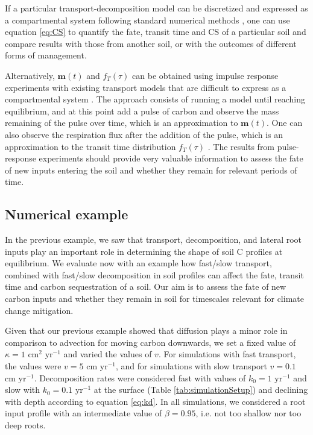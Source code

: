 \documentclass[11pt, oneside, a4paper]{article}   	%
\begin{document}
If a particular transport-decomposition model can be discretized and expressed as a compartmental system following standard numerical methods \citep{LeVeque2007, Lanczos}, one can use equation \ref{eq:CS} to quantify the fate, transit time and CS of a particular soil and compare results with those from another soil, or with the outcomes of different forms of management. 

Alternatively, $\bm{m}(t)$ and $f_T(\tau)$ can be obtained using impulse response experiments with existing transport models that are difficult to express as a compartmental system \citep{Thompson1999, Metzler2018MG}. The approach consists of running a model until reaching equilibrium, and at this point add a pulse of carbon and observe the mass remaining of the pulse over time, which is an approximation to $\bm{m}(t) $. One can also observe the respiration flux after the addition of the pulse, which is an approximation to the transit time distribution $f_T(\tau)$ \citep{Metzler2018MG}. The results from pulse-response experiments should provide very valuable information to assess the fate of new inputs entering the soil and whether they remain for relevant periods of time. 



\subsection{Numerical example}
In the previous example, we saw that transport, decomposition, and lateral root inputs play an important role in determining the shape of soil C profiles at equilibrium. We evaluate now with an example how fast/slow transport, combined with fast/slow decomposition in soil profiles can affect the fate, transit time and carbon sequestration of a soil. Our aim is to assess the fate of new carbon inputs and whether they remain in soil for timescales relevant for climate change mitigation.

Given that our previous example showed that diffusion plays a minor role in comparison to advection for moving carbon downwards, we set a fixed value of $\kappa = 1$ cm$^2$ yr$^{-1}$ and varied the values of $v$. For simulations with fast transport, the values were $v = 5$ cm yr$^{-1}$, and for simulations with slow transport $v = 0.1$ cm yr$^{-1}$. Decomposition rates were considered fast with values of $k_0 = 1$ yr$^{-1}$ and slow with $k_0 = 0.1$ yr$^{-1}$ at the surface (Table \ref{tab:simulationSetup}) and declining with depth according to equation \ref{eq:kd}. In all simulations, we considered a root input profile with an intermediate value of $\beta = 0.95$, i.e. not too shallow nor too deep roots. 
\end{document}
